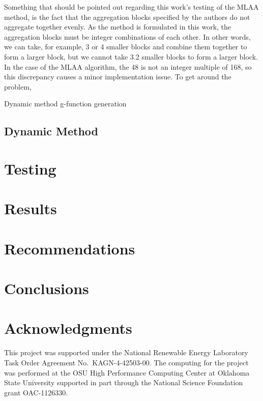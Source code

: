 \documentclass[review,12pt]{elsarticle}
\begin{document}
Something that should be pointed out regarding this work's testing of the MLAA method, is the fact that the aggregation blocks specified by the authors do not aggregate together evenly. As the method is formulated in this work, the aggregation blocks must be integer combinations of each other. In other words, we can take, for example, 3 or 4 smaller blocks and combine them together to form a larger block, but we cannot take 3.2 smaller blocks to form a larger block. In the case of the MLAA algorithm, the 48 is not an integer multiple of 168, so this discrepancy causes a minor implementation issue. To get around the problem, 

Dynamic method g-function generation

\subsection*{Dynamic Method}

\section*{Testing}

\section*{Results}

\section*{Recommendations}

\section*{Conclusions}

\section*{Acknowledgments}
This project was supported under the National Renewable Energy Laboratory Task Order Agreement No.~KAGN-4-42503-00. The computing for the project was performed at the OSU High Performance Computing Center at Oklahoma State University supported in part through the National Science Foundation grant OAC-1126330.


\end{document}
